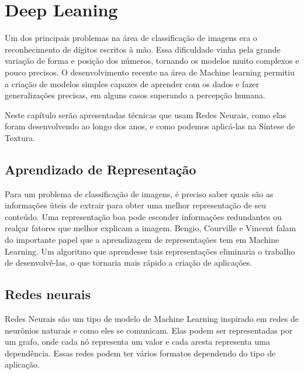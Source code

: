 \chapter{Deep Leaning}


Um dos principais problemas na área
de classificação de imagens era o
reconhecimento de dígitos
escritos à mão. Essa dificuldade
vinha pela grande variação de forma
e posição dos números, tornando 
os modelos muito complexos e pouco
precisos. O desenvolvimento
recente na área de Machine learning
permitiu a criação de modelos
simples capazes de aprender com
os dados e fazer generalizações
precisas, em alguns casos
superando a percepção humana.

Neste capítulo serão apresentadas
técnicas que usam Redes Neurais,
como elas foram desenvolvendo
ao longo dos anos, e como podemos
aplicá-las na Síntese de Textura.



\section{Aprendizado de Representação}

Para um problema de classificação de imagens,
é preciso saber quais são as informações
úteis de extrair para obter uma melhor 
representação de seu conteúdo. 
Uma representação boa pode esconder informações
redundantes ou realçar fatores que 
melhor explicam a imagem.
Bengio, Courville e Vincent
\cite{Bengio2014} falam do importante
papel que a aprendizagem
de representações tem em Machine Learning.
Um algoritmo que aprendesse tais representações
eliminaria o trabalho de desenvolvê-las,
o que tornaria mais rápido a criação de aplicações.






\section{Redes neurais}



Redes Neurais são um tipo 
de modelo de Machine Learning inspirado
em redes de neurônios naturais e como
eles se comunicam. Elas podem ser
representadas por um grafo, onde
cada nó representa um valor e cada aresta
representa uma dependência. Essas
redes podem ter vários formatos
dependendo do tipo de aplicação.


